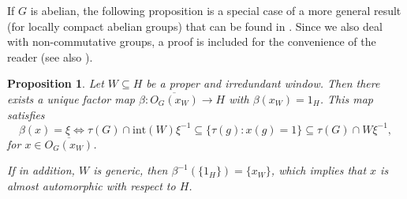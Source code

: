 \documentclass[titlepage,reqno,10pt]{amsart}
\newtheorem{proposition}[theorem]{Proposition}
\theoremstyle{definition}
\begin{document}
If $G$ is abelian, the following proposition is a special case of a more general result (for locally compact abelian groups) that can be found in \cite{BaLeMo07, BjHaPo18}. Since we also deal with non-commutative groups, a proof is included for the convenience of the reader (see also \cite{DJL}). 
\begin{proposition}\label{prop: torus para bis 1}
    Let $W\subseteq H$ be a proper and irredundant window. 
    Then there exists a unique factor map $\beta: \overline{O_G(x_W)} \to H$ with $\beta(x_W) = 1_{H}$.
    This map satisfies 
    \begin{equation}\label{eq: chara beta}
    \beta(x) = \xi   \iff \tau(G)\cap \mathrm{int}(W)\xi^{-1}\subseteq \{\tau(g): x(g)=1\}\subseteq \tau(G)\cap W\xi^{-1},
    \end{equation}
    for $x \in \overline{O_G(x_W)}$.
    
If in addition, $W$ is generic, then $\beta^{-1}(\{1_{H}\})=\{x_W\}$, which implies that $x$ is almost automorphic with respect to $H$.
\end{proposition}
\end{document}
